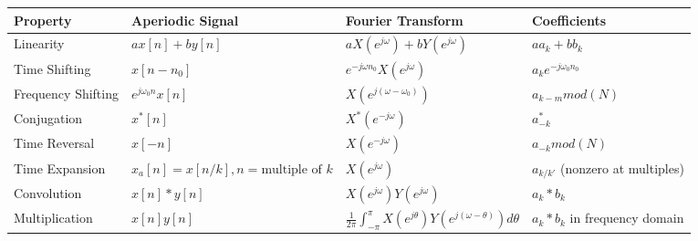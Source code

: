 \documentclass[8pt]{extarticle}
\begin{document}
\begin{table}[h]
    \centering
    \begin{tabular}{|l|l|l|l|}
        \hline
        \textbf{Property}            & \textbf{Aperiodic Signal}                    & \textbf{Fourier Transform}                                                                     & \textbf{Coefficients}                               \\ \hline
        Linearity                    & $a x[n] + b y[n]$                            & $a X(e^{j\omega}) + b Y(e^{j\omega})$                                                          & $a a_k + b b_k$                                     \\ \hline
        Time Shifting                & $x[n - n_0]$                                 & $e^{-j\omega n_0} X(e^{j\omega})$                                                              & $a_k e^{-j\omega_0 n_0}$                            \\ \hline
        Frequency Shifting           & $e^{j\omega_0 n} x[n]$                       & $X(e^{j(\omega - \omega_0)})$                                                                  & $a_{k - m} mod(N)$                                         \\ \hline
        Conjugation                  & $x^*[n]$                                     & $X^*(e^{-j\omega})$                                                                            & $a^*_{-k}$                                          \\ \hline
        Time Reversal                & $x[-n]$                                      & $X(e^{-j\omega})$                                                                              & $a_{-k}mod(N)$                                            \\ \hline
        Time Expansion               & $x_a[n] = x[n/k], n = \text{multiple of } k$ & $X(e^{j\omega})$                                                                               & $a_{k/k'}$ (nonzero at multiples)                   \\ \hline
        Convolution                  & $x[n] * y[n]$                                & $X(e^{j\omega}) Y(e^{j\omega})$                                                                & $a_k * b_k$                                         \\ \hline
        Multiplication               & $x[n] y[n]$                                  & $\frac{1}{2\pi} \int_{-\pi}^{\pi} X(e^{j\theta}) Y(e^{j(\omega - \theta)}) d\theta$            & $a_k * b_k$ in frequency domain                     \\ \hline

\end{tabular}
\end{table}
\end{document}
